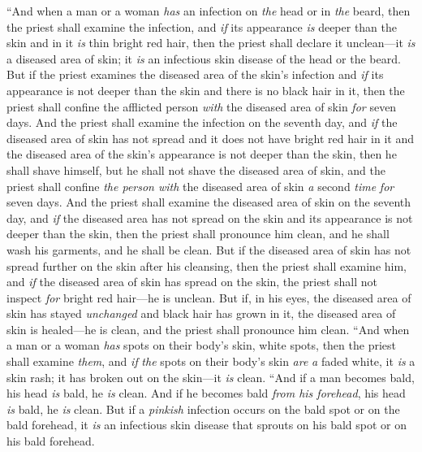 \begin{biblechapter}
\verse “And when a man or a woman \textit{has} an infection on \textit{the} head or in \textit{the} beard,
\verse then the priest shall examine the infection, and \textit{if} its appearance \textit{is} deeper than the skin and in it \textit{is} thin bright red hair, then the priest shall declare it unclean—it \textit{is} a diseased area of skin; it \textit{is} an infectious skin disease of the head or the beard.
\verse But if the priest examines the diseased area of the skin’s infection and \textit{if} its appearance is not deeper than the skin and there is no black hair in it, then the priest shall confine the afflicted person \textit{with} the diseased area of skin \textit{for} seven days.
\verse And the priest shall examine the infection on the seventh day, and \textit{if} the diseased area of skin has not spread and it does not have bright red hair in it and the diseased area of the skin’s appearance is not deeper than the skin,
\verse then he shall shave himself, but he shall not shave the diseased area of skin, and the priest shall confine \textit{the person with} the diseased area of skin \textit{a} second \textit{time} \textit{for} seven days.
\verse And the priest shall examine the diseased area of skin on the seventh day, and \textit{if} the diseased area has not spread on the skin and its appearance is not deeper than the skin, then the priest shall pronounce him clean, and he shall wash his garments, and he shall be clean.
\verse But if the diseased area of skin has not spread further on the skin after his cleansing,
\verse then the priest shall examine him, and \textit{if} the diseased area of skin has spread on the skin, the priest shall not inspect \textit{for} bright red hair—he is unclean.
\verse But if, in his eyes, the diseased area of skin has stayed \textit{unchanged} and black hair has grown in it, the diseased area of skin is healed—he is clean, and the priest shall pronounce him clean.
\verse “And when a man or a woman \textit{has} spots on their body’s skin, white spots,
\verse then the priest shall examine \textit{them}, and \textit{if} \textit{the} spots on their body’s skin \textit{are} \textit{a} faded white, it \textit{is} a skin rash; it has broken out on the skin—it \textit{is} clean.
\verse “And if a man becomes bald, his head \textit{is} bald, he \textit{is} clean.
\verse And if he becomes bald \textit{from his forehead}, his head \textit{is} bald, he \textit{is} clean.
\verse But if a \textit{pinkish} infection occurs on the bald spot or on the bald forehead, it \textit{is} an infectious skin disease that sprouts on his bald spot or on his bald forehead.

\end{biblechapter}
